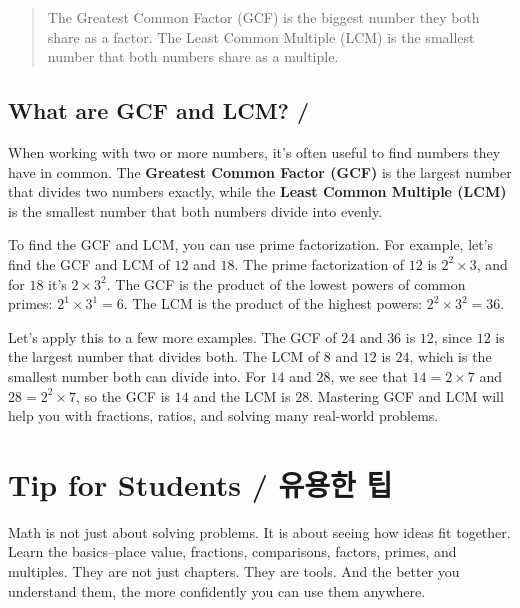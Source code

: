 \blockquote{The Greatest Common Factor (GCF) is the biggest number they both share
as a factor. The Least Common Multiple (LCM) is the smallest number that both
numbers share as a multiple.}



\subsection{What are GCF and LCM? / }

When working with two or more numbers, it's often useful to find numbers they have
in common. The \textbf{Greatest Common Factor (GCF)} is the largest number that
divides two numbers exactly, while the \textbf{Least Common Multiple (LCM)} is the
smallest number that both numbers divide into evenly.

To find the GCF and LCM, you can use prime factorization. For example, let's find
the GCF and LCM of \(12\) and \(18\). The prime factorization of \(12\) is \(2^2
\times 3\), and for \(18\) it's \(2 \times 3^2\). The GCF is the product of the
lowest powers of common primes: \(2^1 \times 3^1 = 6\). The LCM is the product of
the highest powers: \(2^2 \times 3^2 = 36\).

Let's apply this to a few more examples. The GCF of \(24\) and \(36\) is \(12\),
since \(12\) is the largest number that divides both. The LCM of \(8\) and \(12\)
is \(24\), which is the smallest number both can divide into. For \(14\) and
\(28\), we see that \(14 = 2 \times 7\) and \(28 = 2^2 \times 7\), so the GCF is
\(14\) and the LCM is \(28\). Mastering GCF and LCM will help you with fractions,
ratios, and solving many real-world problems.













\newpage
\section{Tip for Students / 유용한 팁}
Math is not just about solving problems. It is about seeing how ideas fit
together. Learn the basics--place value, fractions, comparisons, factors, primes,
and multiples. They are not just chapters. They are tools. And the better you
understand them, the more confidently you can use them anywhere.


